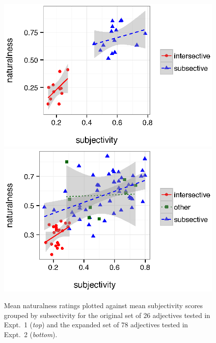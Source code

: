 \documentclass[12pt]{article}
\begin{document}
\renewcommand\thefigure{A.\arabic{figure}}
\begin{figure}
	\centering\includegraphics[width=4.5in]{plots/expt1-subjectivity-subsectivity.eps}\\\includegraphics[width=4.5in]{plots/expt3-subjectivity-subsectivity.eps}
	\caption{Mean naturalness ratings plotted against mean subjectivity scores grouped by subsectivity for the original set of 26 adjectives tested in Expt.~1 (\emph{top}) and the expanded set of 78 adjectives tested in Expt.~2 (\emph{bottom}).}\label{fig:subsectivity}
\end{figure}
\end{document}
